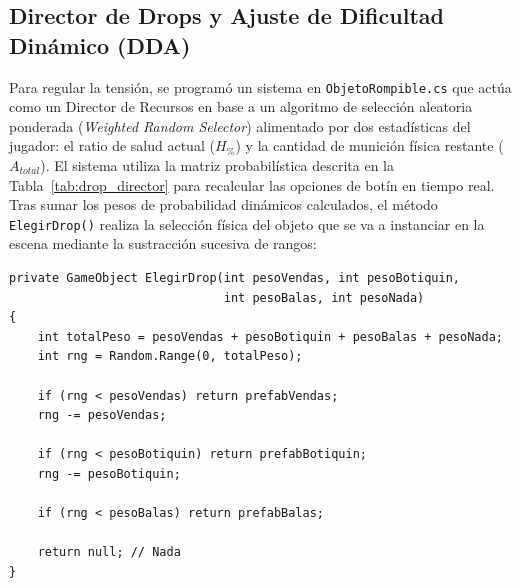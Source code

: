\subsection{Director de Drops y Ajuste de Dificultad Dinámico (DDA)}
Para regular la tensión, se programó un sistema en \texttt{ObjetoRompible.cs} que actúa como un Director de Recursos en base a un algoritmo de selección aleatoria ponderada (\textit{Weighted Random Selector}) alimentado por dos estadísticas del jugador: el ratio de salud actual ($H_{\%}$) y la cantidad de munición física restante ($A_{total}$). El sistema utiliza la matriz probabilística descrita en la Tabla~\ref{tab:drop_director} para recalcular las opciones de botín en tiempo real. Tras sumar los pesos de probabilidad dinámicos calculados, el método \texttt{ElegirDrop()} realiza la selección física del objeto que se va a instanciar en la escena mediante la sustracción sucesiva de rangos:

\begin{table}[htbp]
\centering
{}
\caption{Matriz de pesos probabilísticos del Director de Drops en base al estado del jugador.}
\label{tab:drop_director}
\end{table}

\begin{verbatim}
private GameObject ElegirDrop(int pesoVendas, int pesoBotiquin,
                              int pesoBalas, int pesoNada)
{
    int totalPeso = pesoVendas + pesoBotiquin + pesoBalas + pesoNada;
    int rng = Random.Range(0, totalPeso);

    if (rng < pesoVendas) return prefabVendas;
    rng -= pesoVendas;

    if (rng < pesoBotiquin) return prefabBotiquin;
    rng -= pesoBotiquin;

    if (rng < pesoBalas) return prefabBalas;

    return null; // Nada
}
\end{verbatim}

